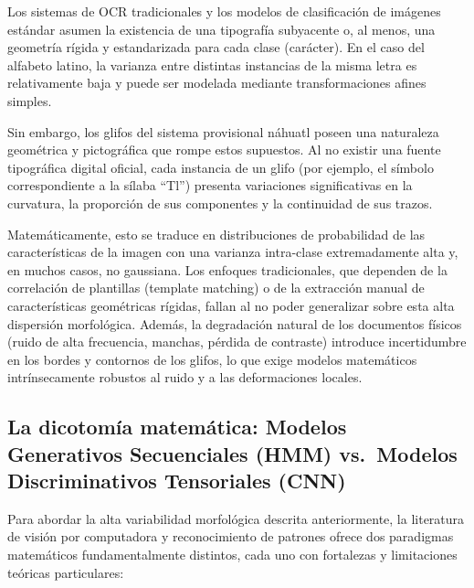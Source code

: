 \documentclass[
  spanish,
  us-letterpaper,
  DIV=11,
  numbers=noendperiod]{scrreprt}
\begin{document}
Los sistemas de OCR tradicionales y los modelos de clasificación de
imágenes estándar asumen la existencia de una tipografía subyacente o,
al menos, una geometría rígida y estandarizada para cada clase
(carácter). En el caso del alfabeto latino, la varianza entre distintas
instancias de la misma letra es relativamente baja y puede ser modelada
mediante transformaciones afines simples.

Sin embargo, los glifos del sistema provisional náhuatl poseen una
naturaleza geométrica y pictográfica que rompe estos supuestos. Al no
existir una fuente tipográfica digital oficial, cada instancia de un
glifo (por ejemplo, el símbolo correspondiente a la sílaba ``Tl'')
presenta variaciones significativas en la curvatura, la proporción de
sus componentes y la continuidad de sus trazos.

Matemáticamente, esto se traduce en distribuciones de probabilidad de
las características de la imagen con una varianza intra-clase
extremadamente alta y, en muchos casos, no gaussiana. Los enfoques
tradicionales, que dependen de la correlación de plantillas (template
matching) o de la extracción manual de características geométricas
rígidas, fallan al no poder generalizar sobre esta alta dispersión
morfológica. Además, la degradación natural de los documentos físicos
(ruido de alta frecuencia, manchas, pérdida de contraste) introduce
incertidumbre en los bordes y contornos de los glifos, lo que exige
modelos matemáticos intrínsecamente robustos al ruido y a las
deformaciones locales.

\subsection{La dicotomía matemática: Modelos Generativos Secuenciales
(HMM) vs.~Modelos Discriminativos Tensoriales
(CNN)}\label{la-dicotomuxeda-matemuxe1tica-modelos-generativos-secuenciales-hmm-vs.-modelos-discriminativos-tensoriales-cnn}

Para abordar la alta variabilidad morfológica descrita anteriormente, la
literatura de visión por computadora y reconocimiento de patrones ofrece
dos paradigmas matemáticos fundamentalmente distintos, cada uno con
fortalezas y limitaciones teóricas particulares:
\end{document}
